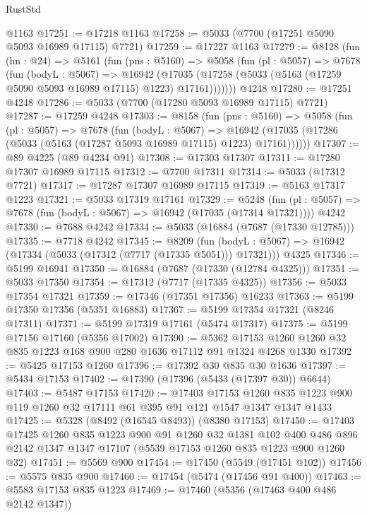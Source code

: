 \begin{lexlean}{RustStd}
\begin{coremodule}
    @1163
@17251 := @17218 @1163
@17258 := @5033 (@7700 (@17251 @5090 @5093 @16989 @17115) @7721)
@17259 := @17227 @1163
@17279 := @8128
    (fun (hn : @24) =>
    @5161
      (fun (pns : @5160) =>
      @5058
        (fun (pl : @5057) =>
        @7678
          (fun (bodyL : @5067) =>
          @16942
            (@17035 (@17258 (@5033 (@5163 (@17259 @5090 @5093 @16989 @17115) @1223) @17161)))))))
    @4248
@17280 := @17251 @4248
@17286 := @5033 (@7700 (@17280 @5093 @16989 @17115) @7721)
@17287 := @17259 @4248
@17303 := @8158
    (fun (pns : @5160) =>
    @5058
      (fun (pl : @5057) =>
      @7678
        (fun (bodyL : @5067) =>
        @16942 (@17035 (@17286 (@5033 (@5163 (@17287 @5093 @16989 @17115) @1223) @17161))))))
@17307 := @89 @4225 (@89 @4234 @91)
@17308 := @17303 @17307
@17311 := @17280 @17307 @16989 @17115
@17312 := @7700 @17311
@17314 := @5033 (@17312 @7721)
@17317 := @17287 @17307 @16989 @17115
@17319 := @5163 @17317 @1223
@17321 := @5033 @17319 @17161
@17329 := @5248
    (fun (pl : @5057) => @7678 (fun (bodyL : @5067) => @16942 (@17035 (@17314 @17321))))
    @4242
@17330 := @7688 @4242
@17334 := @5033 (@16884 (@7687 (@17330 @12785)))
@17335 := @7718 @4242
@17345 := @8209
    (fun (bodyL : @5067) => @16942 (@17334 (@5033 (@17312 (@7717 (@17335 @5051))) @17321)))
    @4325
@17346 := @5199 @16941
@17350 := @16884 (@7687 (@17330 (@12784 @4325)))
@17351 := @5033 @17350
@17354 := @17312 (@7717 (@17335 @4325))
@17356 := @5033 @17354 @17321
@17359 := @17346 (@17351 @17356) @16233
@17363 := @5199 @17350 @17356 (@5351 @16883)
@17367 := @5199 @17354 @17321 (@8246 @17311)
@17371 := @5199 @17319 @17161 (@5474 @17317)
@17375 := @5199 @17156 @17160 (@5356 @17002)
@17390 := @5362 @17153 @1260 @1260 @32 @835 @1223 @168 @900 @280 @1636 @17112 @91 @1324 @4268 @1330
@17392 := @5425 @17153 @1260
@17396 := @17392 @30 @835 @30 @1636
@17397 := @5434 @17153
@17402 := @17390 (@17396 (@5433 (@17397 @30)) @6644)
@17403 := @5487 @17153
@17420 := @17403
    @17153
    @1260
    @835
    @1223
    @900
    @119
    @1260
    @32
    @17111
    @61
    @395
    @91
    @121
    @1547
    @1347
    @1347
    @1433
@17425 := @5328 (@8492 (@16545 @8493)) (@8380 @17153)
@17450 := @17403
    @17425
    @1260
    @835
    @1223
    @900
    @91
    @1260
    @32
    @1381
    @102
    @400
    @486
    @896
    @2142
    @1347
    @1347
    @17107
    (@5539 @17153 @1260 @835 @1223 @900 @1260 @32)
@17451 := @5569 @900
@17454 := @17450 (@5549 (@17451 @102))
@17456 := @5575 @835 @900
@17460 := @17454 (@5474 (@17456 @91 @400))
@17463 := @5583 @17153 @835 @1223
@17469 := @17460 (@5356 (@17463 @400 @486 @2142 @1347))

\end{coremodule}
\end{lexlean}
